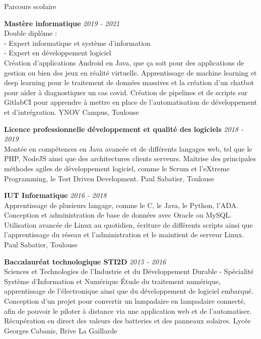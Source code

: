 \documentclass[
	11pt, %
]{resume} %
\begin{document}
\begin{rSection}{Parcours scolaire}
	
	\textbf{Mastère informatique} \hfill \textit{2019 - 2021} \\ 
	Double diplôme : \\
	- Expert informatique et système d'information \\ 
	- Expert en développement logiciel \\
	Création d'applications Android en Java, que ça soit pour des applications de gestion ou bien des jeux en réalité virtuelle. 
	Apprentissage de machine learning et deep learning pour le traitement de données massives et la création d'un chatbot pour aider à diagnostiquer un cas covid. 
	Création de pipelines et de scripts sur GitlabCI pour apprendre à mettre en place de l'automatisation de développement et d'intrégration.
	\hfill { YNOV Campus, Toulouse }


	\textbf{Licence professionnelle développement et qualité des logiciels} \hfill {\em 2018 - 2019} \\ 
	Montée en compétences en Java avancée et de différents langages web, tel que le PHP, NodeJS ainsi que des architectures clients serveurs. 
	Maitrise des principales méthodes agiles de développement logiciel, comme le Scrum et l'eXtreme Programming, le Test Driven Development. 
	\hfill { Paul Sabatier, Toulouse }

	\textbf{IUT Informatique} \hfill {\em 2016 - 2018} \\
	Apprentissage de plusieurs langage, comme le C, le Java, le Python, l'ADA. Conception et administration de base de données avec Oracle ou MySQL. 
	Utilisation avancée de Linux au quotidien, écriture de différents scripts ainsi que l'apprentissage du réseau et l'administration et le maintient de serveur Linux.
	\hfill { Paul Sabatier, Toulouse }

	{\bf Baccalauréat technologique STI2D } \hfill {\em 2015 - 2016} \\ 
	Sciences et Technologies de l'Industrie et du Développement Durable - Spécialité Système d'Information et Numérique
	Étude du traitement numérique, apprentissage de l'électronique ainsi que du développement de logiciel embarqué. 
	Conception d'un projet pour convertir un lampadaire en lampadaire connecté, afin de pouvoir le piloter à distance via une application web et de l'automatiser. 
	Récupération en direct des valeurs des batteries et des panneaux solaires.  
	\hfill { Lycée Georges Cabanis, Brive La Gaillarde }

\end{rSection}
\end{document}
